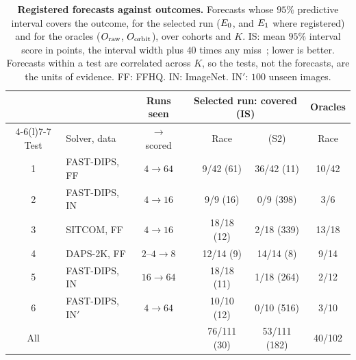 \begin{table}[t]
\centering\footnotesize
\setlength{\tabcolsep}{2.2pt}
\begin{tabular}{@{}clccccc@{}}
\toprule
 & & Runs seen & \multicolumn{3}{c}{Selected run: covered (IS)} & Oracles \\
\cmidrule(lr){4-6}\cmidrule(l){7-7}
Test & Solver, data & $\to$ scored & & Race & (S2) & Race \\
\midrule
1 & FAST-DIPS, FF & $4\to64$ & & 9/42 (61) & 36/42 (11) & 10/42 \\
2 & FAST-DIPS, IN & $4\to16$ & & 9/9 (16) & 0/9 (398) & 3/6 \\
3 & SITCOM, FF & $4\to16$ & & 18/18 (12) & 2/18 (339) & 13/18 \\
4 & DAPS-2K, FF & $2$--$4\to8$ & & 12/14 (9) & 14/14 (8) & 9/14 \\
5 & FAST-DIPS, IN & $16\to64$ & & 18/18 (11) & 1/18 (264) & 2/12 \\
6 & FAST-DIPS, IN$'$ & $4\to64$ & & 10/10 (12) & 0/10 (516) & 3/10 \\
\midrule
All & & & & 76/111 (30) & 53/111 (182) & 40/102 \\
\bottomrule
\end{tabular}
\caption{\textbf{Registered forecasts against outcomes.} Forecasts whose $95\%$ predictive interval covers the outcome, for the selected run ($E_0$, and $E_1$ where registered) and for the oracles ($O_{\mathrm{raw}}$, $O_{\mathrm{orbit}}$), over cohorts and $K$. IS: mean $95\%$ interval score in points, the interval width plus $40$ times any miss~\cite{gneiting2007scoring}; lower is better. Forecasts within a test are correlated across $K$, so the tests, not the forecasts, are the units of evidence. FF: FFHQ. IN: ImageNet. IN$'$: $100$ unseen images.}
\label{tab:forecasts}
\end{table}

